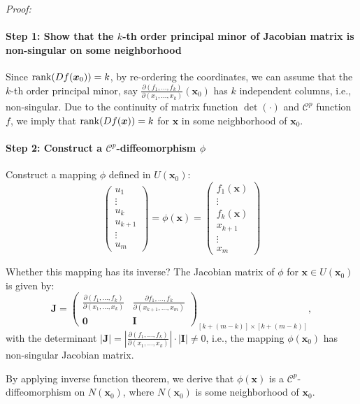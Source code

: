 \textit{Proof:}
\paragraph{Step 1: Show that the $k$-th order principal minor of Jacobian matrix is non-singular on some neighborhood}
Since $\operatorname{rank}(Df(\bm x_0))=k$, by re-ordering the coordinates, we can assume that the $k$-th order principal minor, say $\frac{\partial (f_1,\dots,f_k)}{\partial (x_1,\dots,x_k)}(\bm x_0)$ has $k$ independent columns, i.e., non-singular. Due to the continuity of matrix function $\det(\cdot)$ and $\mathcal{C}^p$ function $f$, we imply that $\operatorname{rank}(Df(\bm x))=k$ for $\bm x$ in some neighborhood of $\bm x_0$.

\paragraph{Step 2: Construct a $\mathcal{C}^p$-diffeomorphism $\phi$}
Construct a mapping $\phi$ defined in $U(\bm x_0)$:
\begin{equation}\label{Eq:11:18}
\begin{pmatrix}
u_1\\\vdots\\u_k\\u_{k+1}\\\vdots\\u_m
\end{pmatrix}
=
\phi(\bm x)
=\begin{pmatrix}
f_1(\bm x)\\
\vdots\\
f_k(\bm x)\\
x_{k+1}\\
\vdots\\
x_m
\end{pmatrix}
\end{equation}

Whether this mapping has its inverse? The Jacobian matrix of $\phi$ for $\bm x\in U(\bm x_0)$ is given by:
\[
\bm J=\begin{pmatrix}
\frac{\partial (f_1,\dots,f_k)}{\partial(x_1,\dots,x_k)}&\frac{\partial {f_1,\dots,f_k}}{\partial (x_{k+1},\dots,x_m)}\\
\bm0&\bm I
\end{pmatrix}_{[k+(m-k)]\times [k+(m-k)]},
\]
with the determinant $|\bm J|=|\frac{\partial (f_1,\dots,f_k)}{\partial(x_1,\dots,x_k)}|\cdot|\bm I|\ne0$, i.e., the mapping $\phi(\bm x_0)$ has non-singular Jacobian matrix. 

By applying inverse function theorem, we derive that $\phi(\bm x)$ is a $\mathcal{C}^p$-diffeomorphism on $N(\bm x_0)$, where $N(\bm x_0)$ is some neighborhood of $\bm x_0$.

